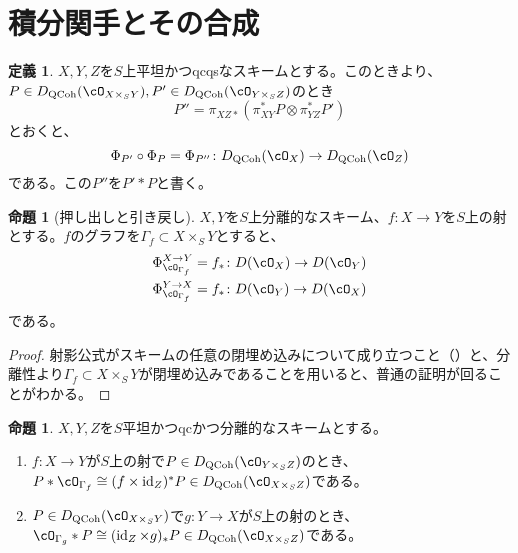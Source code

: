 \documentclass[uplatex, a4paper, dvipdfmx]{jsarticle}
\theoremstyle{definition}
\newtheorem{definition}[theorem]{定義}
\newtheorem{proposition}[theorem]{命題}
\DeclareMathOperator{\id}{\mathrm{id}}
\DeclareMathOperator{\QCoh}{\mathrm{QCoh}}
\begin{document}
\section{積分関手とその合成}
\begin{definition}
    $X, Y, Z$を$S$上平坦かつqcqsなスキームとする。このとき{\cite[\href{https://stacks.math.columbia.edu/tag/0FYS}{Tag 0FYS}]{stacks-project}}より、$P \in D_{\QCoh}(\cO_{X \times_S Y}), P' \in D_{\QCoh}(\cO_{Y \times_S Z})$のとき
    \begin{equation}
        P'' = \pi_{XZ*}(\pi_{XY}^*P \otimes \pi_{YZ}^*P')
    \end{equation}
    とおくと、
    \begin{equation}
        \Phi_{P'} \circ \Phi_P = \Phi_{P''}\colon D_{\QCoh}(\cO_X) \to D_{\QCoh}(\cO_Z)
    \end{equation}
    である。この$P''$を$P' * P$と書く。
\end{definition}
\begin{proposition}[押し出しと引き戻し]\label{ex:push-pull-as-integral-functor}
    $X, Y$を$S$上分離的なスキーム、$f \colon X \to Y$を$S$上の射とする。$f$のグラフを$\Gamma_f \subset X \times_S Y$とすると、
    \begin{align}
        \Phi_{\cO_{\Gamma_f}}^{X \to Y} = f_* & \colon D(\cO_X) \to D(\cO_Y) \\
        \Phi_{\cO_{\Gamma_f}}^{Y \to X} = f_* & \colon D(\cO_Y) \to D(\cO_X)
    \end{align}
    である。
\end{proposition}
\begin{proof}
    射影公式がスキームの任意の閉埋め込みについて成り立つこと（{\cite[\href{https://stacks.math.columbia.edu/tag/08EU}{Tag 08EU}]{stacks-project}}）と、分離性より$\Gamma_f \subset X \times_S Y$が閉埋め込みであることを用いると、普通の証明が回ることがわかる。
\end{proof}
\begin{proposition}
    $X, Y, Z$を$S$平坦かつqcかつ分離的なスキームとする。
    \begin{enumerate}
        \item $f \colon X \to Y$が$S$上の射で$P \in D_{\QCoh}(\cO_{Y \times_S Z})$のとき、$P * \cO_{\Gamma_f} \cong (f \times \id_Z)^*P \in D_{\QCoh}(\cO_{X \times_S Z})$である。
        \item $P \in D_{\QCoh}(\cO_{X \times_S Y})$で$g \colon Y \to X$が$S$上の射のとき、$\cO_{\Gamma_g} * P \cong (\id_Z \times g)_*P \in D_{\QCoh}(\cO_{X \times_S Z})$である。
    \end{enumerate}
\end{proposition}
\end{document}
